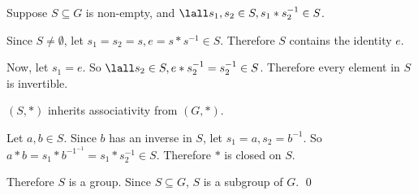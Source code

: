 
        Suppose $S \subseteq G$ is non-empty, 
        and $\lall s_1, s_2 \in S, s_1 * s_2^{-1} \in S$.

        Since $S \neq \emptyset$, let $s_1 = s_2 = s, e = s * s^{-1} \in S$. 
        Therefore $S$ contains the identity $e$.

        Now, let $s_1 = e$.
        So $\lall s_2 \in S, e * s_2^{-1} = s_2^{-1} \in S$.
        Therefore every element in $S$ is invertible.

        $(S, *)$ inherits associativity from $(G, *)$.

        Let $a, b \in S$.
        Since $b$ has an inverse in $S$,
        let $s_1 = a, s_2 = b^{-1}$.
        So $a * b = s_1 * b^{{-1}^{-1}} = s_1 * s_2^{-1} \in S$.
        Therefore $*$ is closed on $S$.

        Therefore $S$ is a group.
        Since $S \subseteq G$, $S$ is a subgroup of $G$. 
        \qed
